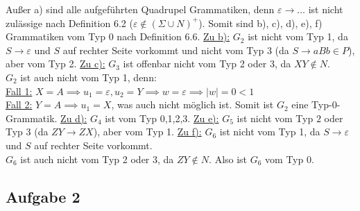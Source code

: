 \begin{lösung}
	Außer a) sind alle aufgeführten Quadrupel Grammatiken, denn $\varepsilon\to\ldots$ ist nicht zulässige nach Definition 6.2 ($\varepsilon\not\in(\Sigma\cup N)^+$).
	Somit sind b), c), d), e), f) Grammatiken vom Typ 0 nach Definition 6.6.\nl
	\underline{Zu b):}
	$G_2$ ist nicht vom Typ 1, da $S\to\varepsilon$ und $S$ auf rechter Seite vorkommt und nicht vom Typ 3 (da $S\to aBb\in P$), aber vom Typ 2.\nl
	\underline{Zu c):}
	$G_3$ ist offenbar nicht vom Typ 2 oder 3, da $XY\not\in N$.\\
	$G_2$ ist auch nicht vom Typ 1, denn:\\
	\underline{Fall 1:} $X=A\implies u_1=\varepsilon,u_2=Y\implies w=\varepsilon\implies |w|=0<1$\\
	\underline{Fall 2:} $Y=A\implies u_1=X$, was auch nicht möglich ist.
	Somit ist $G_2$ eine Typ-0-Grammatik.\nl
	\underline{Zu d):}
	$G_4$ ist vom Typ 0,1,2,3.\nl
	\underline{Zu e):}
	$G_5$ ist nicht vom Typ $2$ oder Typ 3 (da $ZY\to ZX$), aber vom Typ 1.\nl
	\underline{Zu f):}
	$G_6$ ist nicht vom Typ 1, da $S\to\varepsilon$ und $S$ auf rechter Seite vorkommt.\\
	$G_6$ ist auch nicht vom Typ 2 oder 3, da $ZY\not\in N$.
	Also ist $G_6$ vom Typ 0.
\end{lösung}

\subsection{Aufgabe 2}

